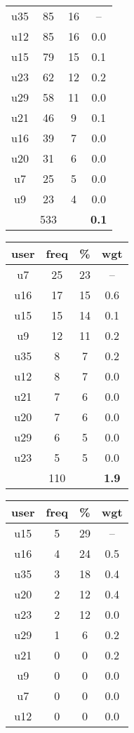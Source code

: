 \begin{appendices}
\begin{table}
\begin{tabular}{ |c|c|c|c| }
	\hline
	u35 & 85 & 16 & -- \\
	u12 & 85 & 16 & 0.0 \\
	u15 & 79 & 15 & 0.1 \\
	u23 & 62 & 12 & 0.2 \\
	u29 & 58 & 11 & 0.0 \\
	u21 & 46 & 9 & 0.1 \\
	u16 & 39 & 7 & 0.0 \\
	u20 & 31 & 6 & 0.0 \\
	u7 & 25 & 5 & 0.0 \\
	u9 & 23 & 4 & 0.0 \\
	 & 533 & & \textbf{0.1} \\
	\hline
\end{tabular}
\begin{tabular}{ |c|c|c|c| }
	\hline
	\textbf{user} & \textbf{freq} & \textbf{\%} & \textbf{wgt} \\
	\hline
	u7 & 25 & 23 & -- \\
	u16 & 17 & 15 & 0.6 \\
	u15 & 15 & 14 & 0.1 \\
	u9 & 12 & 11 & 0.2 \\
	u35 & 8 & 7 & 0.2 \\
	u12 & 8 & 7 & 0.0 \\
	u21 & 7 & 6 & 0.0 \\
	u20 & 7 & 6 & 0.0 \\
	u29 & 6 & 5 & 0.0 \\
	u23 & 5 & 5 & 0.0 \\
	 & 110 & & \textbf{1.9} \\
	\hline
\end{tabular}
\begin{tabular}{ |c|c|c|c| }
	\hline
	\textbf{user} & \textbf{freq} & \textbf{\%} & \textbf{wgt} \\
	\hline
	u15 & 5 & 29 & -- \\
	u16 & 4 & 24 & 0.5 \\
	u35 & 3 & 18 & 0.4 \\
	u20 & 2 & 12 & 0.4 \\
	u23 & 2 & 12 & 0.0 \\
	u29 & 1 & 6 & 0.2 \\
	u21 & 0 & 0 & 0.2 \\
	u9 & 0 & 0 & 0.0 \\
	u7 & 0 & 0 & 0.0 \\
	u12 & 0 & 0 & 0.0 \\

\end{tabular}
\end{table}
\end{appendices}
